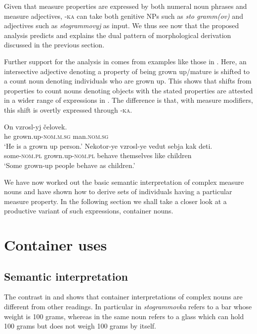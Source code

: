 \documentclass[output=paper]{langscibook}
\begin{document}
\noindent Given that measure properties are expressed by both numeral noun phrases and measure adjectives, \textsc{-ka} can take both genitive NPs such as \textit{sto gramm(ov)} and adjectives such as \textit{stogrammovyj} as input. We thus see now that the proposed analysis predicts and explains the dual pattern of morphological derivation discussed in the previous section.\largerpage

Further support for the analysis in  comes from examples like those in . Here, an intersective adjective denoting a property of being grown up/\hspace{0pt}mature is shifted to a count noun denoting individuals who are grown up. This shows that shifts from properties to count nouns denoting objects with the stated properties are attested in a wider range of expressions in . The difference is that, with measure modifiers, this shift is overtly expressed through \textsc{-ka}.

\ea\label{ex:khrizmann:19}
    \ea\label{ex:khrizmann:19a} \gll On vzrosl-yj čelovek.\\
    he grown.up-\textsc{nom.m.sg} man.\textsc{nom.sg}\\
    \glt `He is a grown up person.'
    \ex\label{ex:khrizmann:19b} \gll Nekotor-ye vzrosl-ye vedut sebja kak deti.\\
    some-\textsc{nom.pl} grown.up-\textsc{nom.pl} behave themselves like children\\
    \glt `Some grown-up people behave as children.'
\z\z

\noindent We have now worked out the basic semantic interpretation of complex measure nouns and have shown how to derive sets of individuals having a particular measure property. In the following section we shall take a closer look at a productive variant of such expressions, container nouns.

%
%

\section{Container uses}\label{sec:4}
\subsection{Semantic interpretation}\label{sec:4.1}

The contrast in  and  shows that container interpretations of complex nouns are different from other readings. In particular in  \textit{stogrammovka} refers to a bar whose weight is 100 grams, whereas in  the same noun refers to a glass which can hold 100 grams but does not weigh 100 grams by itself.
\end{document}
